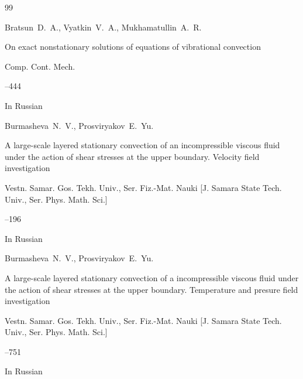 \begin{thebibliography}{99}

\by Bratsun~D.~A., Vyatkin~V.~A., Mukhamatullin~A.~R.

\paper On exact nonstationary solutions of equations of vibrational convection

\jour Comp. Cont. Mech.




–444

\lang In Russian





\by Burmasheva~N.~V., Prosviryakov~E.~Yu.

\paper A large-scale layered stationary convection of an incompressible viscous fluid under the action of shear stresses at the upper boundary. Velocity field investigation

\jour Vestn. Samar. Gos. Tekh. Univ., Ser. Fiz.-Mat. Nauki \rm [J. Samara State Tech. Univ., Ser. Phys. Math. Sci.]




--196

\lang In Russian 






\by Burmasheva~N.~V., Prosviryakov~E.~Yu.

\paper A large-scale layered stationary convection of a incompressible viscous fluid under the action of shear stresses at the upper boundary. Temperature and presure field investigation

\jour Vestn. Samar. Gos. Tekh. Univ., Ser. Fiz.-Mat. Nauki \rm [J. Samara State Tech. Univ., Ser. Phys. Math. Sci.]




--751

\lang In Russian 






\end{thebibliography}
